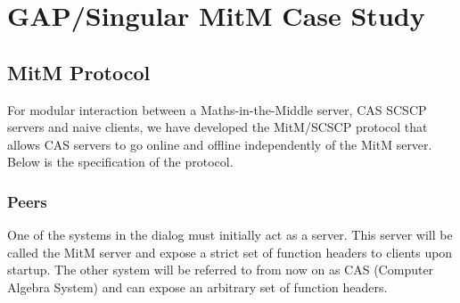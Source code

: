 \section{GAP/Singular MitM Case Study}\label{sec:mitm_poc}
\subsection{MitM Protocol}

For modular interaction between a Maths-in-the-Middle server, CAS SCSCP servers 
and naive clients, we have developed the MitM/SCSCP protocol that allows CAS 
servers to go online and offline independently of the MitM server. Below is the 
specification of the protocol.

\subsubsection{Peers}
One of the systems in the dialog must initially act as a server. This server will 
be called the MitM server and expose a strict set of function headers to clients 
upon startup. The other system will be referred to from now on as CAS (Computer 
Algebra System) and can expose an arbitrary set of function headers.

